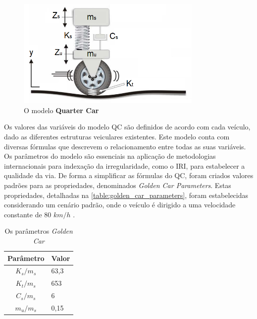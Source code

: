 \begin{figure}[h]
  \centering
  \caption{O modelo \textbf{Quarter Car}}
   \label{fig:quarter_car}
   \includegraphics[width=0.8\textwidth]{figuras/fig_4.png}
\end{figure}

Os valores das variáveis do modelo QC são definidos de acordo com cada veículo, dado as diferentes estruturas veiculares existentes. Este modelo conta com diversas fórmulas que descrevem o relacionamento entre todas as suas variáveis. Os parâmetros do modelo são essenciais na aplicação de metodologias internacionais para indexação da irregularidade, como o IRI, para estabelecer a qualidade da via. De forma a simplificar as fórmulas do QC, foram criados valores padrões para as propriedades, denominados \textit{Golden Car Parameters}. Estas propriedades, detalhadas na \autoref{table:golden_car_parameters}, foram estabelecidas considerando um cenário padrão, onde o veículo é dirigido a uma velocidade constante de 80 $km/h$ \cite{Loizos2008}.

\begin{table}[h]
    \caption{Os parâmetros \textit{Golden Car}}
    \label{table:golden_car_parameters}
    \centering
    \small
    \begin{tabular}{cl}
        \toprule
        \textbf{Parâmetro} & \textbf{Valor} \\
        \toprule
        $K_s/m_s$ & 63,3 \\
        \midrule
        $K_t/m_s$ & 653 \\
        \midrule
        $C_s/m_s$ & 6 \\
        \midrule
        $m_u/m_s$ & 0,15 \\
        \bottomrule
    \end{tabular}
\end{table}

